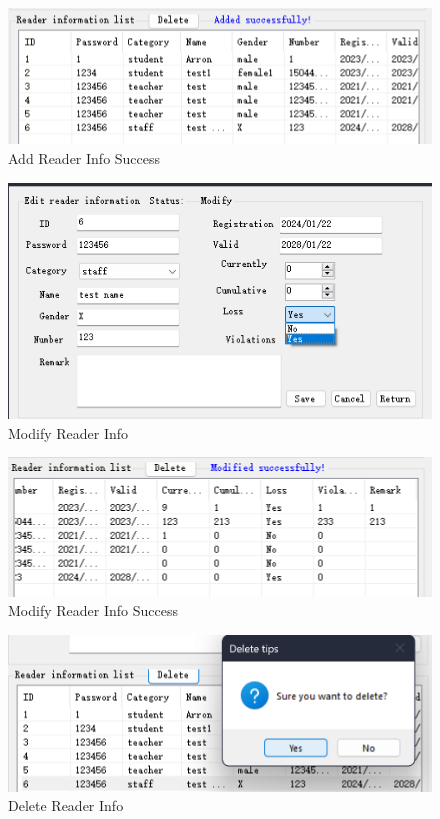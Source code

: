 \documentclass{article}
\begin{document}
\begin{figure}[H]
    \centering
    \includegraphics[width=1\textwidth]{../pic/add_suc.png}
    \caption{Add Reader Info Success}
    \label{fig:add_suc}
\end{figure}

\begin{figure}[H]
    \centering
    \includegraphics[width=1\textwidth]{../pic/modify.png}
    \caption{Modify Reader Info}
    \label{fig:modify}
\end{figure}

\begin{figure}[H]
    \centering
    \includegraphics[width=1\textwidth]{../pic/modify_suc.png}
    \caption{Modify Reader Info Success}
    \label{fig:modify_suc}
\end{figure}

\begin{figure}[H]
    \centering
    \includegraphics[width=1\textwidth]{../pic/delete.png}
    \caption{Delete Reader Info}
    \label{fig:delete}
\end{figure}
\end{document}
